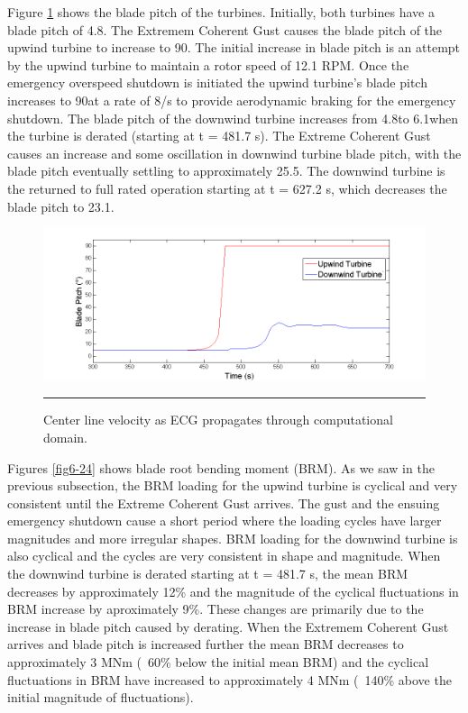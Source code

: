 Figure \ref{fig6-23} shows the blade pitch of the turbines. Initially, both turbines have a blade pitch of 4.8\degree. The Extremem Coherent Gust causes the blade pitch of the upwind turbine to increase to 90\degree. The initial increase in blade pitch is an attempt by the upwind turbine to maintain a rotor speed of 12.1 RPM. Once the emergency overspeed shutdown is initiated the upwind turbine's blade pitch increases to 90\degree at a rate of 8\degree/s to provide aerodynamic braking for the emergency shutdown. The blade pitch of the downwind turbine increases from 4.8\degree to 6.1\degree when the turbine is derated (starting at t = 481.7 s). The Extreme Coherent Gust causes an increase and some oscillation in downwind turbine blade pitch, with the blade pitch eventually settling to approximately 25.5\degree. The downwind turbine is the returned to full rated operation starting at t = 627.2 s, which decreases the blade pitch to 23.1\degree.

\begin{figure}[htbp] \label{fig6-23}
	\centering
		\includegraphics[trim = {1cm 0 2cm 0}, clip, width = \linewidth]{Figures/ch6Figures/fig6-23.png}
		\rule{35em}{0.5pt}
	\caption{Center line velocity as ECG propagates through computational domain.}
\end{figure}

Figures \ref{fig6-24} shows blade root bending moment (BRM). As we saw in the previous subsection, the BRM loading for the upwind turbine is cyclical and very consistent until the Extreme Coherent Gust arrives. The gust and the ensuing emergency shutdown cause a short period where the loading cycles have larger magnitudes and more irregular shapes. BRM loading for the downwind turbine is also cyclical and the cycles are very consistent in shape and magnitude. When the downwind turbine is derated starting at t = 481.7 s, the mean BRM decreases by approximately 12\% and the magnitude of the cyclical fluctuations in BRM increase by aproximately 9\%. These changes are primarily due to the increase in blade pitch caused by derating. When the Extremem Coherent Gust arrives and blade pitch is increased further the mean BRM decreases to approximately 3 MNm (~60\% below the initial mean BRM) and the cyclical fluctuations in BRM have increased to approximately 4 MNm (~140\% above the initial magnitude of fluctuations).

